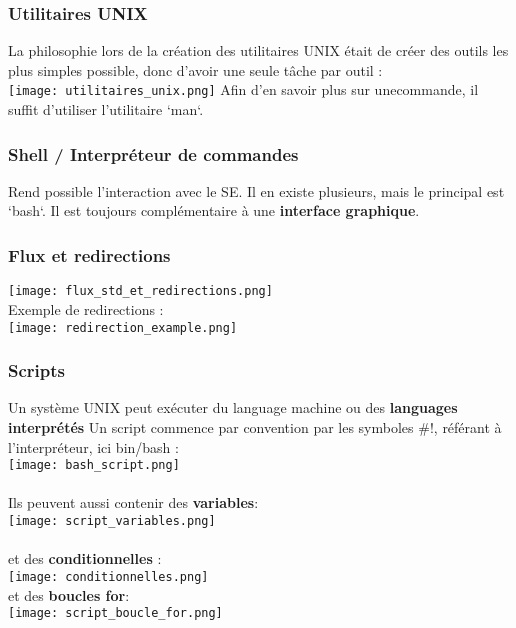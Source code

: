 \documentclass{article}
\begin{document}
            \subsubsection{Utilitaires UNIX}
                La philosophie lors de la création des utilitaires UNIX était
                de créer des outils les plus simples possible,
                donc d'avoir une seule tâche par outil :\\
                \texttt{[image: utilitaires\_unix.png]}
                Afin d'en savoir plus sur unecommande, il suffit d'utiliser l'utilitaire `man`.
            
            \subsubsection{Shell / Interpréteur de commandes}
                Rend possible l'interaction avec le SE.
                Il en existe plusieurs, mais le principal est `bash`.
                Il est toujours complémentaire à une \textbf{interface graphique}.
            
            \subsubsection{Flux et redirections}
                \texttt{[image: flux\_std\_et\_redirections.png]}\\
                Exemple de redirections :\\
                \texttt{[image: redirection\_example.png]}
            
                \subsubsection{Scripts}
                    Un système UNIX peut exécuter du language machine ou des \textbf{languages interprétés}
                    Un script commence par convention par les symboles $\#!$, référant à l'interpréteur, ici bin/bash :\\
                    \texttt{[image: bash\_script.png]}\\\\
                    Ils peuvent aussi contenir des \textbf{variables}:\\
                    \texttt{[image: script\_variables.png]}\\\\
                    et des \textbf{conditionnelles} :\\
                    \texttt{[image: conditionnelles.png]}\\
                    et des \textbf{boucles for}:\\
                    \texttt{[image: script\_boucle\_for.png]}

    
\end{document}
